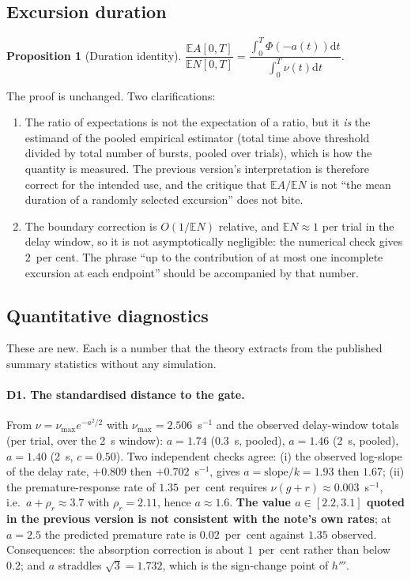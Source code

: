 \documentclass[11pt,a4paper]{article}
\newcommand{\E}{\mathbb{E}}
\newcommand{\dd}{\mathrm{d}}
\theoremstyle{plain}
\newtheorem{proposition}{Proposition}
\theoremstyle{remark}
\begin{document}
\subsection{Excursion duration}

\begin{proposition}[Duration identity]
$\dfrac{\E A[0,T]}{\E N[0,T]}=\dfrac{\int_0^T\Phi(-a(t))\dd t}{\int_0^T\nu(t)\dd t}$.
\end{proposition}
The proof is unchanged. Two clarifications:
\begin{enumerate}
\item The ratio of expectations is not the expectation of a ratio, but it \emph{is} the
estimand of the pooled empirical estimator (total time above threshold divided by total
number of bursts, pooled over trials), which is how the quantity is measured. The previous
version's interpretation is therefore correct for the intended use, and the critique that
$\E A/\E N$ is not ``the mean duration of a randomly selected excursion'' does not bite.
\item The boundary correction is $O(1/\E N)$ relative, and $\E N\approx1$ per trial in the
delay window, so it is not asymptotically negligible: the numerical check gives $2$~per
cent. The phrase ``up to the contribution of at most one incomplete excursion at each
endpoint'' should be accompanied by that number.
\end{enumerate}

\subsection{Quantitative diagnostics}
\label{sec:diagnostics}

These are new. Each is a number that the theory extracts from the published summary
statistics without any simulation.

\paragraph{D1. The standardised distance to the gate.}
From $\nu=\nu_{\max}e^{-a^2/2}$ with $\nu_{\max}=2.506$~s$^{-1}$ and the observed
delay-window totals (per trial, over the 2~s window):
$a=1.74$ (0.3~s, pooled), $a=1.46$ (2~s, pooled), $a=1.40$ (2~s, $c=0.50$).
Two independent checks agree: (i) the observed log-slope of the delay rate,
$+0.809$ then $+0.702$~s$^{-1}$, gives $a=\text{slope}/k=1.93$ then $1.67$; (ii) the
premature-response rate of $1.35$~per~cent requires
$\nu(g+r)\approx0.003$~s$^{-1}$, i.e.\ $a+\rho_r\approx3.7$ with $\rho_r=2.11$, hence
$a\approx1.6$.
\textbf{The value $a\in[2.2,3.1]$ quoted in the previous version is not consistent with
the note's own rates}; at $a=2.5$ the predicted premature rate is $0.02$~per~cent against
$1.35$ observed. Consequences: the absorption correction is about $1$~per~cent rather than
below $0.2$; and $a$ straddles $\sqrt3=1.732$, which is the sign-change point of $h'''$.
\end{document}
